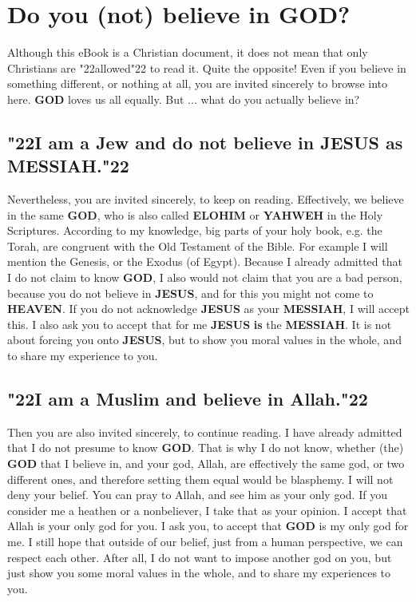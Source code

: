 \documentclass[10pt,a5paper]{article}
\newcommand{\God}[0]{\textbf{GOD}}
\newcommand{\Elohim}[0]{\textbf{ELOHIM}}
\newcommand{\Heaven}[0]{\textbf{HEAVEN}}
\newcommand{\Jesus}[0]{\textbf{JESUS}}
\newcommand{\Messiah}[0]{\textbf{MESSIAH}}
\newcommand{\Yahweh}[0]{\textbf{YAHWEH}}
\newcommand{\q}[1]{\char"22{#1}\char"22 }
\begin{document}
	\newpage
	\section{Do you (not) believe in {\God}?}
		Although this eBook is a Christian document,
		it does not mean that only Christians are \q{allowed} to read it.
		Quite the opposite!
		Even if you believe in something different,
		or nothing at all,
		you are invited sincerely to browse into here.
		{\God} loves us all equally.
		But ... what do you actually believe in?

	\subsection{\q{I am a Jew and do not believe in {\Jesus} as {\Messiah}.}}
		Nevertheless,
		you are invited sincerely,
		to keep on reading.
		Effectively,
		we believe in the same {\God},
		who is also called {\Elohim} or {\Yahweh} in the Holy Scriptures.
		According to my knowledge,
		big parts of your holy book,
		e.g. the Torah,
		are congruent with the Old Testament of the Bible.
		For example I will mention the Genesis,
		or the Exodus (of Egypt).
		Because I already admitted that I do not claim to know {\God},
		I also would not claim that you are a bad person,
		because you do not believe in {\Jesus},
		and for this you might not come to {\Heaven}.
		If you do not acknowledge {\Jesus} as your {\Messiah},
		I will accept this.
		I also ask you to accept that for me {\Jesus} \textbf{is} the {\Messiah}.
		It is not about forcing you onto {\Jesus},
		but to show you moral values in the whole,
		and to share my experience to you.
		
	\subsection{\q{I am a Muslim and believe in Allah.}}
		Then you are also invited sincerely,
		to continue reading.
		I have already admitted
		that I do not presume to know {\God}.
		That is why I do not know,
		whether (the) {\God} that I believe in,
		and your god,
		Allah,
		are effectively the same god,
		or two different ones,
		and therefore setting them equal would be blasphemy.
		I will not deny your belief.
		You can pray to Allah,
		and see him as your only god.
		If you consider me a heathen or a nonbeliever,
		I take that as your opinion.
		I accept that Allah is your only god for you.
		I ask you,
		to accept that {\God} is my only god for me.
		I still hope that outside of our belief,
		just from a human perspective,
		we can respect each other.
		After all,
		I do not want to impose another god on you,
		but just show you some moral values in the whole,
		and to share my experiences to you.
	
\end{document}
